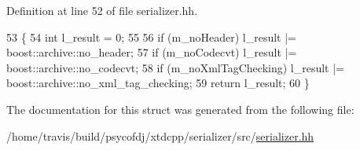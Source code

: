 Definition at line 52 of file serializer.\-hh.


\begin{DoxyCode}
53   \{
54     \textcolor{keywordtype}{int} l\_result = 0;
55 
56     \textcolor{keywordflow}{if} (m\_noHeader)         l\_result |= boost::archive::no\_header;
57     \textcolor{keywordflow}{if} (m\_noCodecvt)        l\_result |= boost::archive::no\_codecvt;
58     \textcolor{keywordflow}{if} (m\_noXmlTagChecking) l\_result |= boost::archive::no\_xml\_tag\_checking;
59     \textcolor{keywordflow}{return} l\_result;
60   \}
\end{DoxyCode}


The documentation for this struct was generated from the following file\-:\begin{DoxyCompactItemize}
\item 
/home/travis/build/psycofdj/xtdcpp/serializer/src/\hyperlink{serializer_8hh}{serializer.\-hh}\end{DoxyCompactItemize}
